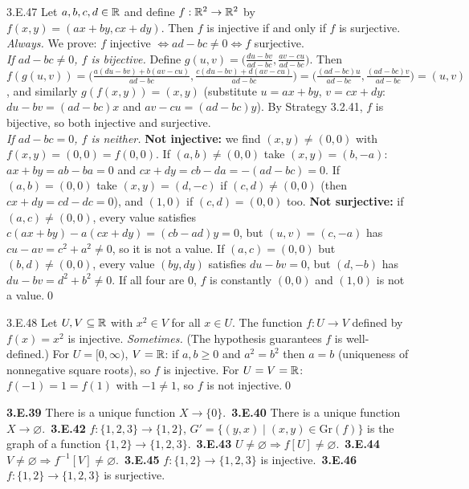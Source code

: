 \begin{bookex}[recommended]{3.E.47}
Let $a,b,c,d\in\mathbb{R}$ and define $f:\mathbb{R}^2\to\mathbb{R}^2$ by $f(x,y)=(ax+by,cx+dy)$. Then $f$ is injective if and only if $f$ is surjective.
\solution
\emph{Always.} We prove: $f$ injective $\Leftrightarrow ad-bc\ne0\Leftrightarrow f$ surjective.\\
\emph{If $ad-bc\ne0$, $f$ is bijective.} Define $g(u,v)=\big(\frac{du-bv}{ad-bc},\frac{av-cu}{ad-bc}\big)$. Then $f(g(u,v))=\big(\frac{a(du-bv)+b(av-cu)}{ad-bc},\frac{c(du-bv)+d(av-cu)}{ad-bc}\big)=\big(\frac{(ad-bc)u}{ad-bc},\frac{(ad-bc)v}{ad-bc}\big)=(u,v)$, and similarly $g(f(x,y))=(x,y)$ (substitute $u=ax+by$, $v=cx+dy$: $du-bv=(ad-bc)x$ and $av-cu=(ad-bc)y$). By Strategy 3.2.41, $f$ is bijective, so both injective and surjective.\\
\emph{If $ad-bc=0$, $f$ is neither.} \textbf{Not injective:} we find $(x,y)\ne(0,0)$ with $f(x,y)=(0,0)=f(0,0)$. If $(a,b)\ne(0,0)$ take $(x,y)=(b,-a)$: $ax+by=ab-ba=0$ and $cx+dy=cb-da=-(ad-bc)=0$. If $(a,b)=(0,0)$ take $(x,y)=(d,-c)$ if $(c,d)\ne(0,0)$ (then $cx+dy=cd-dc=0$), and $(1,0)$ if $(c,d)=(0,0)$ too. \textbf{Not surjective:} if $(a,c)\ne(0,0)$, every value satisfies $c(ax+by)-a(cx+dy)=(cb-ad)y=0$, but $(u,v)=(c,-a)$ has $cu-av=c^2+a^2\ne0$, so it is not a value. If $(a,c)=(0,0)$ but $(b,d)\ne(0,0)$, every value $(by,dy)$ satisfies $du-bv=0$, but $(d,-b)$ has $du-bv=d^2+b^2\ne0$. If all four are $0$, $f$ is constantly $(0,0)$ and $(1,0)$ is not a value.\qed
\end{bookex}

\begin{bookex}[essential]{3.E.48}
Let $U,V\subseteq\mathbb{R}$ with $x^2\in V$ for all $x\in U$. The function $f:U\to V$ defined by $f(x)=x^2$ is injective.
\solution
\emph{Sometimes.} (The hypothesis guarantees $f$ is well-defined.) For $U=[0,\infty)$, $V=\mathbb{R}$: if $a,b\ge0$ and $a^2=b^2$ then $a=b$ (uniqueness of nonnegative square roots), so $f$ is injective. For $U=V=\mathbb{R}$: $f(-1)=1=f(1)$ with $-1\ne1$, so $f$ is not injective.\qed
\end{bookex}

\begin{trybox}[{3.E.39, 3.E.40, 3.E.42--3.E.46 \fO}]
\textbf{3.E.39} There is a unique function $X\to\{0\}$.\ \textbf{3.E.40} There is a unique function $X\to\varnothing$.\ \textbf{3.E.42} $f:\{1,2,3\}\to\{1,2\}$, $G'=\{(y,x)\mid(x,y)\in\mathrm{Gr}(f)\}$ is the graph of a function $\{1,2\}\to\{1,2,3\}$.\ \textbf{3.E.43} $U\ne\varnothing\Rightarrow f[U]\ne\varnothing$.\ \textbf{3.E.44} $V\ne\varnothing\Rightarrow f^{-1}[V]\ne\varnothing$.\ \textbf{3.E.45} $f:\{1,2\}\to\{1,2,3\}$ is injective.\ \textbf{3.E.46} $f:\{1,2\}\to\{1,2,3\}$ is surjective.
\end{trybox}
